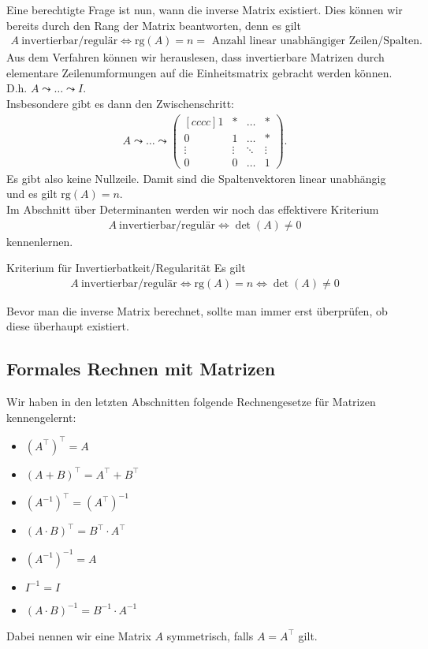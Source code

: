 Eine berechtigte Frage ist nun, wann die inverse Matrix existiert. 
Dies können wir bereits durch den Rang der Matrix beantworten, denn es gilt
\begin{align*}
A \ \text{invertierbar/regulär} \Leftrightarrow \mathrm{rg}(A) = n = \text{ Anzahl linear unabhängiger Zeilen/Spalten}.
\end{align*}
Aus dem Verfahren können wir herauslesen, dass invertierbare Matrizen durch elementare Zeilenumformungen auf die Einheitsmatrix gebracht werden können.
D.h. $A \leadsto \dots \leadsto I$.\\
Insbesondere gibt es dann den Zwischenschritt:
\begin{align*}
A \leadsto \dots \leadsto
\begin{pmatrix}	[cccc]
1 &  \ast  & \ldots & \ast \\
0  &  1 & \ldots & \ast \\
\vdots & \vdots & \ddots & \vdots \\
0  &   0       &\ldots & 1
\end{pmatrix}.
\end{align*}
Es gibt also keine Nullzeile. 
Damit sind die Spaltenvektoren linear unabhängig und es gilt $\mathrm{rg}(A) = n$.\\
Im Abschnitt über Determinanten werden wir noch das effektivere Kriterium
\begin{align*}
A \ \text{invertierbar/regulär} \Leftrightarrow \det(A) \neq 0
\end{align*}
kennenlernen.\\

\begin{mybox}{Kriterium für Invertierbatkeit/Regularität}
Es gilt
\begin{align*}
A \ \text{invertierbar/regulär} 
\Leftrightarrow
\mathrm{rg}(A) = n
\Leftrightarrow
\det(A) \neq 0
\end{align*}
\end{mybox}

Bevor man die inverse Matrix berechnet, sollte man immer erst überprüfen, ob diese überhaupt existiert.

\newpage
\subsection{Formales Rechnen mit Matrizen}
Wir haben in den letzten Abschnitten folgende Rechnengesetze für Matrizen kennengelernt:
\begin{itemize}
\item
$(A^\top)^\top =A$
\item
$(A + B)^\top = A^\top + B^\top$
\item
$(A^{-1})^\top = (A^\top)^{-1}$
\item
$(A \cdot B)^\top = B^\top \cdot A^\top$
\item $(A^{-1})^{-1} = A$
\item $I^{-1} = I$
\item $(A\cdot B )^{-1} = B^{-1} \cdot A^{-1}$
\end{itemize}
Dabei nennen wir eine Matrix $A$ symmetrisch, falls $A = A^\top$ gilt.
\ \\
\ \\
